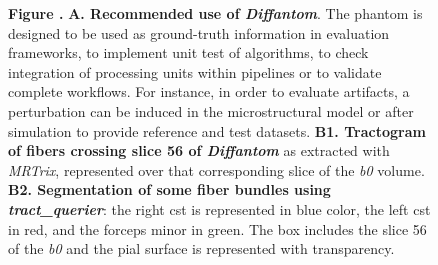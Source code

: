 \documentclass[english]{frontiers/frontiersSCNS} %
\begin{document}
\begin{figure}[h!]
\begin{center}

\end{center}
\textbf{\label{fig:figure2} Figure . }%
{\textbf{A. Recommended use of \emph{Diffantom}}.
The phantom is designed to be used as ground-truth information in evaluation frameworks,
  to implement unit test of algorithms, to check integration of processing units within
  pipelines or to validate complete workflows.
For instance, in order to evaluate artifacts, a perturbation can be induced in the microstructural
  model or after simulation to provide reference and test datasets.
\textbf{B1. Tractogram of fibers crossing slice 56 of \emph{Diffantom}} as extracted with \emph{MRTrix},
  represented over that corresponding slice of the \emph{b0} volume.
\textbf{B2. Segmentation of some fiber bundles using \emph{tract\_querier}}: the right \gls*{cst} is
  represented in blue color, the left \gls*{cst} in red, and the forceps minor in green.
  The box includes the slice 56 of the \emph{b0} and the pial surface is represented with transparency.
}
\end{figure}
\end{document}
